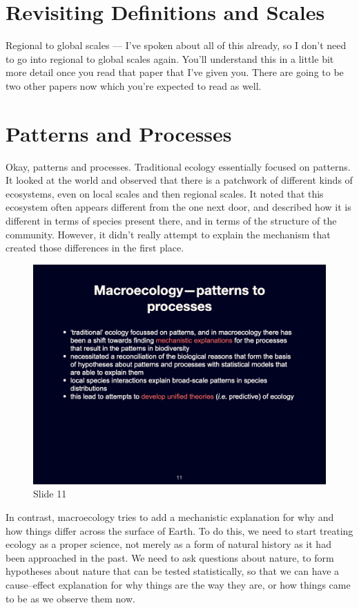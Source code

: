 \documentclass[
  12pt,
]{book}
\begin{document}
\section{Revisiting Definitions and
Scales}\label{revisiting-definitions-and-scales}

Regional to global scales --- I've spoken about all of this already, so
I don't need to go into regional to global scales again. You'll
understand this in a little bit more detail once you read that paper
that I've given you. There are going to be two other papers now which
you're expected to read as well.

\section{Patterns and Processes}\label{patterns-and-processes}

Okay, patterns and processes. Traditional ecology essentially focused on
patterns. It looked at the world and observed that there is a patchwork
of different kinds of ecosystems, even on local scales and then regional
scales. It noted that this ecosystem often appears different from the
one next door, and described how it is different in terms of species
present there, and in terms of the structure of the community. However,
it didn't really attempt to explain the mechanism that created those
differences in the first place.

\begin{figure}[ht]
\centering
\includegraphics[width=0.8\linewidth]{../images/BDC334/BDC334-011.jpeg}
\caption*{Slide 11}
\end{figure}

In contrast, macroecology tries to add a mechanistic explanation for why
and how things differ across the surface of Earth. To do this, we need
to start treating ecology as a proper science, not merely as a form of
natural history as it had been approached in the past. We need to ask
questions about nature, to form hypotheses about nature that can be
tested statistically, so that we can have a cause--effect explanation
for why things are the way they are, or how things came to be as we
observe them now.
\end{document}
